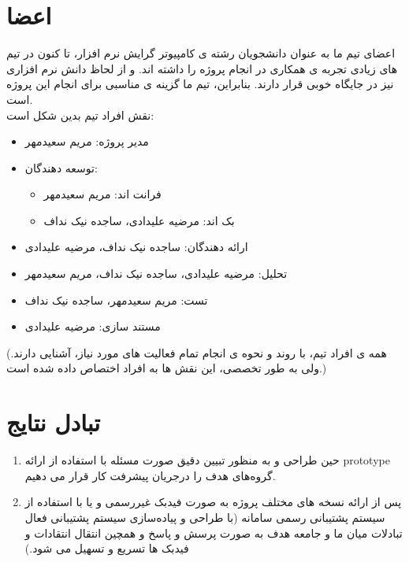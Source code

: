 \documentclass{article}
\begin{document}
	\section{اعضا}
	اعضای تیم ما به عنوان دانشجویان رشته ی کامپیوتر گرایش نرم افزار، تا کنون در تیم های زیادی تجربه ی همکاری در انجام پروژه را داشته اند. و از لحاظ دانش نرم افزاری نیز در جایگاه خوبی قرار دارند. بنابراین، تیم ما گزینه ی مناسبی برای انجام این پروژه است.\\
	نقش افراد تیم بدین شکل است:
	\begin{itemize}
		\item مدیر پروژه: مریم سعیدمهر
		\item توسعه دهندگان:  
		\begin{itemize}
			\item فرانت اند: مریم سعیدمهر
			\item بک اند: مرضیه علیدادی، ساجده نیک نداف
		\end{itemize}	
		\item ارائه دهندگان: ساجده نیک نداف، مرضیه علیدادی
		\item تحلیل: مرضیه علیدادی، ساجده نیک نداف، مریم سعیدمهر		
		\item تست: مریم سعیدمهر، ساجده نیک نداف
		\item مستند سازی: مرضیه علیدادی
	\end{itemize}
	(همه ی افراد تیم، با روند و نحوه ی انجام تمام فعالیت های مورد نیاز، آشنایی دارند. ولی به طور تخصصی، این نقش ها به افراد اختصاص داده شده است.)
	\section{تبادل نتایج}
	\begin{enumerate}
		\item حین طراحی و به منظور تبیین دقیق صورت مسئله با استفاده از ارائه prototype گروه‌های هدف را درجریان پیشرفت کار قرار می دهیم.	
		\item پس از ارائه نسخه های مختلف پروژه به صورت فیدبک غیررسمی و یا با استفاده از سیستم پشتیبانی رسمی سامانه (با طراحی و پیاده‌سازی سیستم پشتیبانی فعال تبادلات میان ما و جامعه هدف به صورت پرسش و پاسخ و همچین انتقال انتقادات و فیدبک ها تسریع و تسهیل می شود.)
	\end{enumerate}
	
\end{document}
